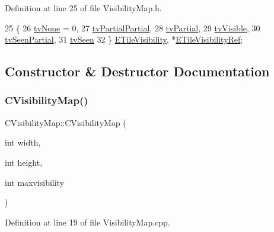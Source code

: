 Definition at line 25 of file Visibility\+Map.\+h.


\begin{DoxyCode}
25                     \{
26             \hyperlink{classCVisibilityMap_a6665f905da08825adbb0eee7bd1f2f30aec106086bdc6328c8c6c02ee1bf32d2c}{tvNone} = 0,
27             \hyperlink{classCVisibilityMap_a6665f905da08825adbb0eee7bd1f2f30a75af969b6d667b802b64bacd8bca7b63}{tvPartialPartial},
28             \hyperlink{classCVisibilityMap_a6665f905da08825adbb0eee7bd1f2f30a0037f47075e3bde5e8e32dbd55754976}{tvPartial},
29             \hyperlink{classCVisibilityMap_a6665f905da08825adbb0eee7bd1f2f30a3c881652ef7164aa086e595eef0ff5d6}{tvVisible},
30             \hyperlink{classCVisibilityMap_a6665f905da08825adbb0eee7bd1f2f30a7f9292f5d7ed9e9497f8ef342c890466}{tvSeenPartial},
31             \hyperlink{classCVisibilityMap_a6665f905da08825adbb0eee7bd1f2f30ab7c30a117286ac3a8891862f6c1bb5c6}{tvSeen}
32         \} \hyperlink{classCVisibilityMap_a6665f905da08825adbb0eee7bd1f2f30}{ETileVisibility}, *\hyperlink{classCVisibilityMap_a6cf5b0323092b90b86a6d3d8778b4fb1}{ETileVisibilityRef};
\end{DoxyCode}


\subsection{Constructor \& Destructor Documentation}
\hypertarget{classCVisibilityMap_aa5f898269a92cc63487ccca7d4c4de04}{}\label{classCVisibilityMap_aa5f898269a92cc63487ccca7d4c4de04} 
\subsubsection{\texorpdfstring{C\+Visibility\+Map()}{CVisibilityMap()}\hspace{0.1cm}{\footnotesize\ttfamily [1/2]}}
{\footnotesize\ttfamily C\+Visibility\+Map\+::\+C\+Visibility\+Map (\begin{DoxyParamCaption}\item[{int}]{width,  }\item[{int}]{height,  }\item[{int}]{maxvisibility }\end{DoxyParamCaption})}



Definition at line 19 of file Visibility\+Map.\+cpp.


